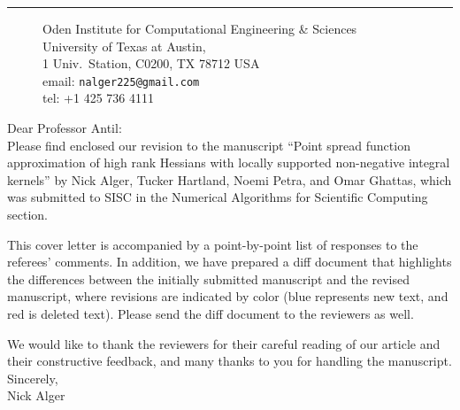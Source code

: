 \documentclass[11pt]{article}
\begin{document}
\pagestyle{empty}
 \begin{figure}
 \begin{minipage}{.5\columnwidth}
 \end{minipage}\hfill
 \begin{minipage}[b]{.48\columnwidth}
\flushright
 \vspace{-0.9cm}
 \end{minipage}
 \end{figure}
 \noindent\rule{\columnwidth}{.5pt}\vspace{-2ex}
 \begin{figure}[h]
 \begin{minipage}{.2\columnwidth}
 \end{minipage}\hfill
 \begin{minipage}{.78\columnwidth}
 \flushright\vspace{-2ex}
 {\noindent Oden Institute for Computational Engineering \& Sciences \\ 
 University of Texas at Austin, \\ 
 1 Univ.\ Station, C0200,
 TX 78712 USA \\
 email: {\tt nalger225@gmail.com}\\
 tel: +1 425 736 4111}\\
 \end{minipage}
 \end{figure}
\phantom{adafdsf}
\vspace{3ex}

\bigskip 

\noindent Dear Professor Antil:\\[2ex]

Please find enclosed our revision to the manuscript ``Point spread function
approximation of high rank Hessians with locally supported
non-negative integral kernels'' by Nick Alger, Tucker Hartland, Noemi
Petra, and Omar Ghattas, which was submitted to SISC in the
Numerical Algorithms for Scientific Computing section.

%
This cover letter is accompanied by a point-by-point list of responses
to the referees' comments. In addition, we have prepared a diff
document that highlights the differences between the initially
submitted manuscript and the revised manuscript, where revisions are indicated by
color (blue represents new text, and red is deleted text). Please send
the diff document to the reviewers as well.

We would like to thank the reviewers for their careful reading of our article 
and their constructive feedback, and many thanks to you for handling the
manuscript.\\[3ex]


\noindent Sincerely,\\[5ex]
\phantom{dd}\hspace{2cm} Nick Alger
\end{document}

